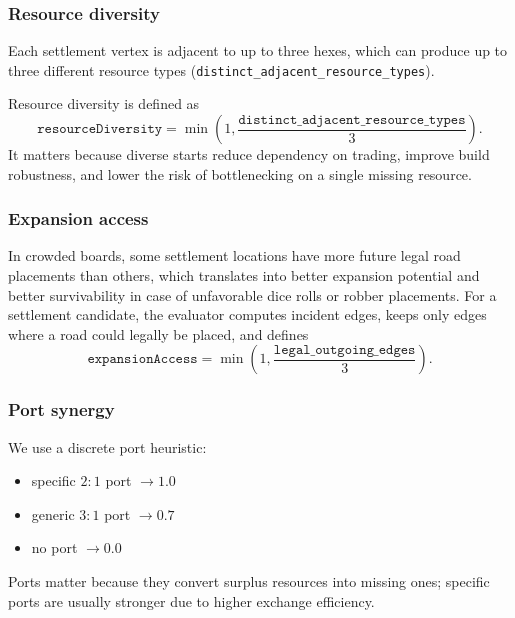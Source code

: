 \documentclass[letter,  12 pt]{article}
\begin{document}
\subsubsection{Resource diversity}
\label{app:resource-diversity}

Each settlement vertex is adjacent to up to three hexes, which can produce up to three different resource types (\texttt{distinct\_adjacent\_resource\_types}).

Resource diversity is defined as
\[
\texttt{resourceDiversity} = \min\left(1, \frac{\texttt{distinct\_adjacent\_resource\_types}}{3}\right).
\]
It matters because diverse starts reduce dependency on trading, improve build robustness, and lower the risk of bottlenecking on a single missing resource.

\subsubsection{Expansion access}
\label{app:expansion-access}
In crowded boards, some settlement locations have more future legal road placements than others, which translates into better expansion potential and better survivability in case of unfavorable dice rolls or robber placements.
For a settlement candidate, the evaluator computes incident edges, keeps only edges where a road could legally be placed, and defines
\[
\texttt{expansionAccess} = \min\left(1, \frac{\texttt{legal\_outgoing\_edges}}{3}\right).
\]

\subsubsection{Port synergy}
\label{app:port-synergy}
We use a discrete port heuristic:
\begin{itemize}
    \item specific $2{:}1$ port $\rightarrow 1.0$
    \item generic $3{:}1$ port $\rightarrow 0.7$
    \item no port $\rightarrow 0.0$
\end{itemize}
Ports matter because they convert surplus resources into missing ones; specific ports are usually stronger due to higher exchange efficiency.
\end{document}
